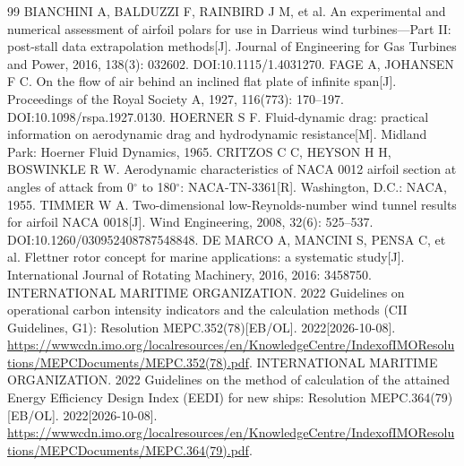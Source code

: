 \documentclass[UTF8,a4paper,twoside,zihao=5,fontset=windows]{ctexart}
\begin{document}
\begin{thebibliography}{99}
BIANCHINI A, BALDUZZI F, RAINBIRD J M, et al. An experimental and numerical assessment of airfoil polars for use in Darrieus wind turbines---Part II: post-stall data extrapolation methods[J]. Journal of Engineering for Gas Turbines and Power, 2016, 138(3): 032602. DOI:10.1115/1.4031270.
FAGE A, JOHANSEN F C. On the flow of air behind an inclined flat plate of infinite span[J]. Proceedings of the Royal Society A, 1927, 116(773): 170--197. DOI:10.1098/rspa.1927.0130.
HOERNER S F. Fluid-dynamic drag: practical information on aerodynamic drag and hydrodynamic resistance[M]. Midland Park: Hoerner Fluid Dynamics, 1965.
CRITZOS C C, HEYSON H H, BOSWINKLE R W. Aerodynamic characteristics of NACA 0012 airfoil section at angles of attack from 0$^{\circ}$ to 180$^{\circ}$: NACA-TN-3361[R]. Washington, D.C.: NACA, 1955.
TIMMER W A. Two-dimensional low-Reynolds-number wind tunnel results for airfoil NACA 0018[J]. Wind Engineering, 2008, 32(6): 525--537. DOI:10.1260/030952408787548848.
DE MARCO A, MANCINI S, PENSA C, et al. Flettner rotor concept for marine applications: a systematic study[J]. International Journal of Rotating Machinery, 2016, 2016: 3458750.
INTERNATIONAL MARITIME ORGANIZATION. 2022 Guidelines on operational carbon intensity indicators and the calculation methods (CII Guidelines, G1): Resolution MEPC.352(78)[EB/OL]. 2022[2026-10-08]. \url{https://wwwcdn.imo.org/localresources/en/KnowledgeCentre/IndexofIMOResolutions/MEPCDocuments/MEPC.352(78).pdf}.
INTERNATIONAL MARITIME ORGANIZATION. 2022 Guidelines on the method of calculation of the attained Energy Efficiency Design Index (EEDI) for new ships: Resolution MEPC.364(79)[EB/OL]. 2022[2026-10-08]. \url{https://wwwcdn.imo.org/localresources/en/KnowledgeCentre/IndexofIMOResolutions/MEPCDocuments/MEPC.364(79).pdf}.
\end{thebibliography}
\endgroup
\end{document}
